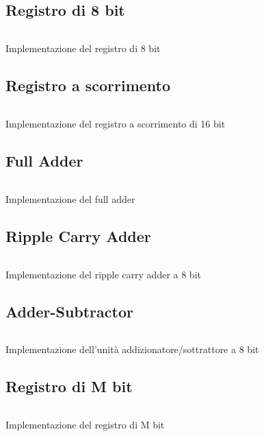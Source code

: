 \subsection*{Registro di 8 bit}
\begin{code}
    \inputminted{vhdl}{vhdl/register_8.vhd}
    \caption{Implementazione del registro di 8 bit}
    \label{cod:register_8}
\end{code}

\subsection*{Registro a scorrimento}
\begin{code}
    \inputminted{vhdl}{vhdl/shiftregister.vhd}
    \caption{Implementazione del registro a scorrimento di 16 bit}
    \label{cod:shiftregister}
\end{code}

\subsection*{Full Adder}
\begin{code}
    \inputminted{vhdl}{vhdl/full_adder.vhd}
    \caption{Implementazione del full adder}
    \label{cod:full_adder}
\end{code}

\subsection*{Ripple Carry Adder}
\begin{code}
    \inputminted{vhdl}{vhdl/ripple_carry_adder_8.vhd}
    \caption{Implementazione del ripple carry adder a 8 bit}
    \label{cod:ripple_carry_adder_8}
\end{code}

\subsection*{Adder-Subtractor}
\begin{code}
    \inputminted{vhdl}{vhdl/adder_subtractor.vhd}
    \caption{Implementazione dell'unità addizionatore/sottrattore a 8 bit}
    \label{cod:adder_subtractor}
\end{code}

\subsection*{Registro di M bit}
\begin{code}
    \inputminted{vhdl}{vhdl/register_M.vhd}
    \caption{Implementazione del registro di M bit}
    \label{cod:register_M}
\end{code}

